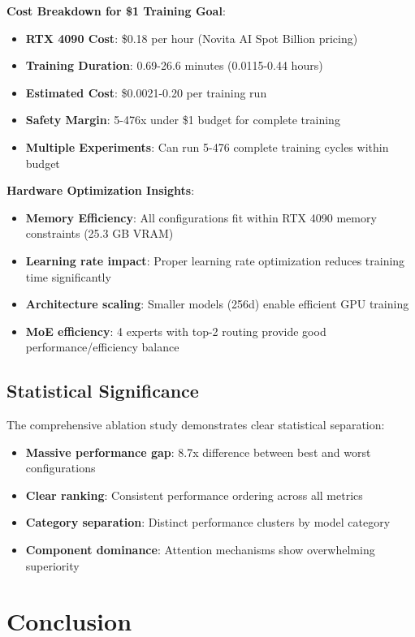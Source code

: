 \documentclass[11pt,a4paper]{article}
\begin{document}
\textbf{Cost Breakdown for \$1 Training Goal}:
\begin{itemize}
    \item \textbf{RTX 4090 Cost}: \$0.18 per hour (Novita AI Spot Billion pricing)
    \item \textbf{Training Duration}: 0.69-26.6 minutes (0.0115-0.44 hours)
    \item \textbf{Estimated Cost}: \$0.0021-0.20 per training run
    \item \textbf{Safety Margin}: 5-476x under \$1 budget for complete training
    \item \textbf{Multiple Experiments}: Can run 5-476 complete training cycles within budget
\end{itemize}

\textbf{Hardware Optimization Insights}:
\begin{itemize}
    \item \textbf{Memory Efficiency}: All configurations fit within RTX 4090 memory constraints (25.3 GB VRAM)
    \item \textbf{Learning rate impact}: Proper learning rate optimization reduces training time significantly
    \item \textbf{Architecture scaling}: Smaller models (256d) enable efficient GPU training
    \item \textbf{MoE efficiency}: 4 experts with top-2 routing provide good performance/efficiency balance
\end{itemize}

\subsection{Statistical Significance}

The comprehensive ablation study demonstrates clear statistical separation:
\begin{itemize}
    \item \textbf{Massive performance gap}: 8.7x difference between best and worst configurations
    \item \textbf{Clear ranking}: Consistent performance ordering across all metrics
    \item \textbf{Category separation}: Distinct performance clusters by model category
    \item \textbf{Component dominance}: Attention mechanisms show overwhelming superiority
\end{itemize}

\section{Conclusion}
\end{document}
